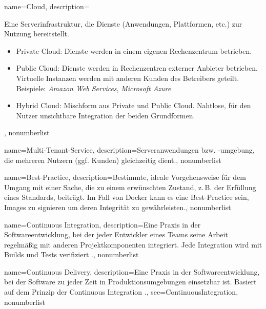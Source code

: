 



{%
  name={Cloud},
  description={Eine Serverinfrastruktur, die Dienste (Anwendungen, Plattformen, etc.) zur Nutzung bereitstellt.
    \begin{itemize}
      \item Private Cloud: Dienste werden in einem eigenen Rechenzentrum betrieben.
      \item Public Cloud: Dienste werden in Rechenzentren externer Anbieter betrieben. Virtuelle Instanzen werden mit anderen Kunden des Betreibers geteilt. Beispiele: \emph{Amazon Web Services}, \emph{Microsoft Azure}
      \item Hybrid Cloud: Mischform aus Private und Public Cloud. Nahtlose, für den Nutzer unsichtbare Integration der beiden Grundformen.
    \end{itemize}},
  nonumberlist
}

{%
  name={Multi-Tenant-Service},
  description={Serveranwendungen bzw. -umgebung, die mehreren Nutzern (ggf. Kunden) gleichzeitig dient.},
  nonumberlist
}

{%
  name={Best-Practice},
  description={Bestimmte, ideale Vorgehensweise für dem Umgang mit einer Sache, die zu einem erwünschten Zustand, z.\,B. der Erfüllung eines Standards, beiträgt. Im Fall von Docker kann es eine Best-Practice sein, Images zu signieren um deren Integrität zu gewährleisten.},
  nonumberlist
}

{%
  name={Continuous Integration},
  description={Eine Praxis in der Softwareentwicklung, bei der jeder Entwickler eines Teams seine Arbeit regelmäßig mit anderen Projektkomponenten integriert. Jede Integration wird mit Builds und Tests verifiziert \cite{ci}.},
  nonumberlist
}

{%
  name={Continuous Delivery},
  description={Eine Praxis in der Softwareentwicklung, bei der Software zu jeder Zeit in Produktionsumgebungen einsetzbar ist. Basiert auf dem Prinzip der Continuous Integration \cite{cd}.},
  see={ContinuousIntegration},
  nonumberlist
}

